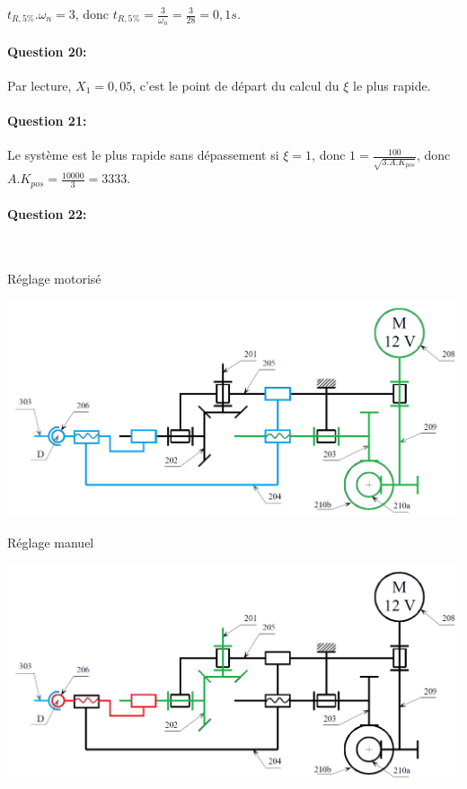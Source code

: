 $t_{R,5\%}.\omega_n=3$, donc $t_{R,5\%}=\frac{3}{\omega_n}=\frac{3}{28}=0,1s$.

\paragraph{Question 20:}

Par lecture, $X_1=0,05$, c'est le point de départ du calcul du $\xi$ le plus rapide.

\paragraph{Question 21:}

Le système est le plus rapide sans dépassement si $\xi=1$, donc $1=\frac{100}{\sqrt{3.A.K_{pos}}}$, donc $A.K_{pos}=\frac{10000}{3}=3333$.

\paragraph{Question 22:}

~\

Réglage motorisé

\begin{center}
  \includegraphics[width=0.8\linewidth]{img/phare101_cor}
\end{center}

Réglage manuel

\begin{center}
  \includegraphics[width=0.8\linewidth]{img/phare102_cor}
\end{center}

